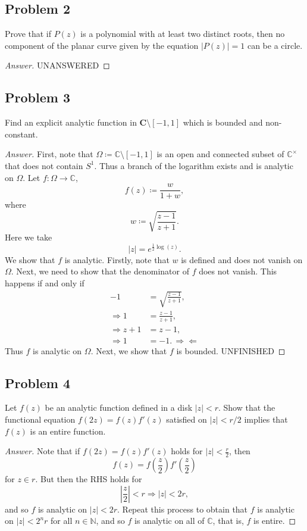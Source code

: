 \documentclass[12pt]{article}
\newcommand{\n}{\mathbb{N}}
\newcommand{\cx}{\mathbb{C}}
\newcommand\paren[1]{\left( #1 \right)}
\newcommand{\abs}[1]{\left| #1 \right|}
\theoremstyle{definition}
\begin{document}
\subsection{Problem 2}
Prove that if $P(z)$ is a polynomial with at least two distinct roots, then no component of the planar curve given by the equation $|P(z)| = 1$ can be a circle. 
\begin{proof}[Answer]
    UNANSWERED 
\end{proof}

\subsection{Problem 3 \texorpdfstring{\cite{Nguyen}}{}}
Find an explicit analytic function in $\mathbf{C} \setminus [-1,1]$ which is bounded and non-constant. 
\begin{proof}[Answer]
    First, note that $\Omega \coloneqq \cx \setminus [-1,1]$ is an open and connected subset of $\cx^{\times}$ that does not contain $S^1$. Thus a branch of the logarithm exists and is analytic on $\Omega$. Let $f : \Omega \to \cx$, 
    \[
        f(z) \coloneqq \frac{w}{1 + w} , 
    \]
    where 
    \[
        w \coloneqq \sqrt{ \frac{z-1}{z+1} } . 
    \]
    Here we take 
    \[
        \abs{z} = e^{\frac{1}{2}\log(z)} . 
    \]
    We show that $f$ is analytic. Firstly, note that $w$ is defined and does not vanish on $\Omega$. Next, we need to show that the denominator of $f$ does not vanish. This happens if and only if 
    \begin{align*}
        -1 & = \sqrt{ \frac{z - 1}{z + 1} } , \\ 
        \Rightarrow 1 & = \frac{z - 1}{z + 1} , \\ 
        \Rightarrow z + 1 & = z - 1 , \\ 
        \Rightarrow 1 & = -1 . \, \Rightarrow \Leftarrow 
    \end{align*}
    Thus $f$ is analytic on $\Omega$. Next, we show that $f$ is bounded. UNFINISHED
\end{proof}

\subsection{Problem 4 \texorpdfstring{\cite{Nguyen}}{}}
Let $f(z)$ be an analytic function defined in a disk $\abs{z} < r$. Show that the functional equation $f(2z) = f(z) f'(z)$ satisfied on $|z| < r/2$ implies that $f(z)$ is an entire function. 
\begin{proof}[Answer]
    Note that if $f(2z) = f(z) f'(z)$ holds for $\abs{z} < \frac{r}{2}$, then 
    \[
        f(z) = f \paren{ \frac{z}{2} } f' \paren{ \frac{z}{2} }
    \]
    for $z \in r$. But then the RHS holds for 
    \[
        \abs{ \frac{z}{2} } < r \Rightarrow \abs{z} < 2r ,
    \]  
    and so $f$ is analytic on $\abs{z} < 2r$. Repeat this process to obtain that $f$ is analytic on $\abs{z} < 2^n r$ for all $n \in \n$, and so $f$ is analytic on all of $\cx$, that is, $f$ is entire. 
\end{proof}
\end{document}
